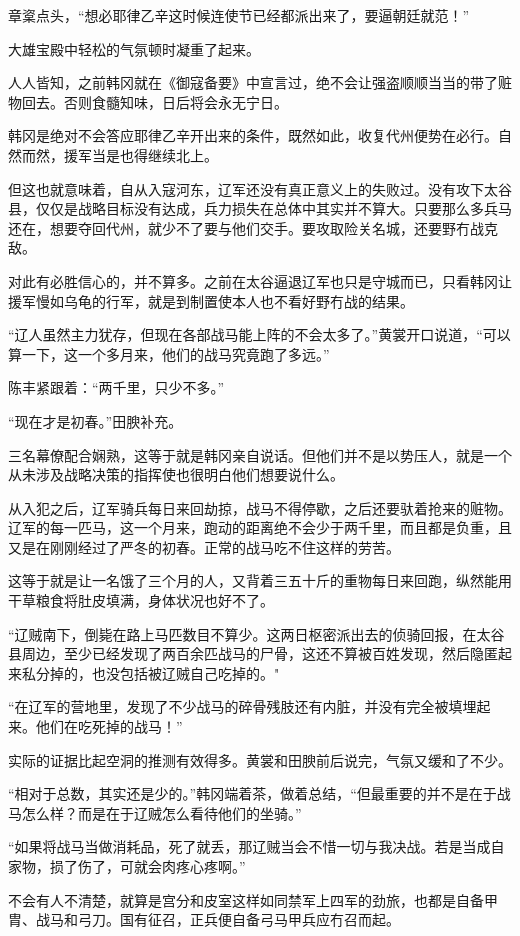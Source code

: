 章楶点头，“想必耶律乙辛这时候连使节已经都派出来了，要逼朝廷就范！”

大雄宝殿中轻松的气氛顿时凝重了起来。

人人皆知，之前韩冈就在《御寇备要》中宣言过，绝不会让强盗顺顺当当的带了赃物回去。否则食髓知味，日后将会永无宁日。

韩冈是绝对不会答应耶律乙辛开出来的条件，既然如此，收复代州便势在必行。自然而然，援军当是也得继续北上。

但这也就意味着，自从入寇河东，辽军还没有真正意义上的失败过。没有攻下太谷县，仅仅是战略目标没有达成，兵力损失在总体中其实并不算大。只要那么多兵马还在，想要夺回代州，就少不了要与他们交手。要攻取险关名城，还要野冇战克敌。

对此有必胜信心的，并不算多。之前在太谷逼退辽军也只是守城而已，只看韩冈让援军慢如乌龟的行军，就是到制置使本人也不看好野冇战的结果。

“辽人虽然主力犹存，但现在各部战马能上阵的不会太多了。”黄裳开口说道，“可以算一下，这一个多月来，他们的战马究竟跑了多远。”

陈丰紧跟着：“两千里，只少不多。”

“现在才是初春。”田腴补充。

三名幕僚配合娴熟，这等于就是韩冈亲自说话。但他们并不是以势压人，就是一个从未涉及战略决策的指挥使也很明白他们想要说什么。

从入犯之后，辽军骑兵每日来回劫掠，战马不得停歇，之后还要驮着抢来的赃物。辽军的每一匹马，这一个月来，跑动的距离绝不会少于两千里，而且都是负重，且又是在刚刚经过了严冬的初春。正常的战马吃不住这样的劳苦。

这等于就是让一名饿了三个月的人，又背着三五十斤的重物每日来回跑，纵然能用干草粮食将肚皮填满，身体状况也好不了。

“辽贼南下，倒毙在路上马匹数目不算少。这两日枢密派出去的侦骑回报，在太谷县周边，至少已经发现了两百余匹战马的尸骨，这还不算被百姓发现，然后隐匿起来私分掉的，也没包括被辽贼自己吃掉的。"

“在辽军的营地里，发现了不少战马的碎骨残肢还有内脏，并没有完全被填埋起来。他们在吃死掉的战马！”

实际的证据比起空洞的推测有效得多。黄裳和田腴前后说完，气氛又缓和了不少。

“相对于总数，其实还是少的。”韩冈端着茶，做着总结，“但最重要的并不是在于战马怎么样？而是在于辽贼怎么看待他们的坐骑。”

“如果将战马当做消耗品，死了就丢，那辽贼当会不惜一切与我决战。若是当成自家物，损了伤了，可就会肉疼心疼啊。”

不会有人不清楚，就算是宫分和皮室这样如同禁军上四军的劲旅，也都是自备甲胄、战马和弓刀。国有征召，正兵便自备弓马甲兵应冇召而起。

